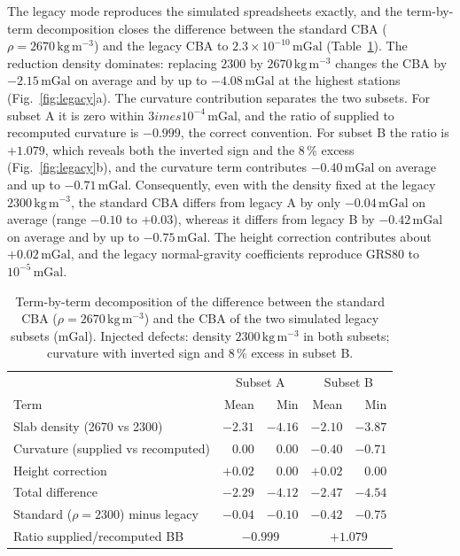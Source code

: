 \documentclass[11pt,a4paper]{article}
\newcommand{\mgal}{\ensuremath{\,\mathrm{mGal}}}
\newcommand{\kgm}{\ensuremath{\,\mathrm{kg\,m^{-3}}}}
\begin{document}
The legacy mode reproduces the simulated spreadsheets exactly, and the term-by-term decomposition closes the difference between the standard CBA ($\rho=2670\kgm$) and the legacy CBA to $2.3\times10^{-10}\mgal$ (Table~\ref{tab:terms}). The reduction density dominates: replacing $2300$ by $2670\kgm$ changes the CBA by $-2.15\mgal$ on average and by up to $-4.08\mgal$ at the highest stations (Fig.~\ref{fig:legacy}a). The curvature contribution separates the two subsets. For subset A it is zero within $3	imes10^{-4}\mgal$, and the ratio of supplied to recomputed curvature is $-0.999$, the correct convention. For subset B the ratio is $+1.079$, which reveals both the inverted sign and the 8\,\% excess (Fig.~\ref{fig:legacy}b), and the curvature term contributes $-0.40\mgal$ on average and up to $-0.71\mgal$. Consequently, even with the density fixed at the legacy $2300\kgm$, the standard CBA differs from legacy A by only $-0.04\mgal$ on average (range $-0.10$ to $+0.03$), whereas it differs from legacy B by $-0.42\mgal$ on average and by up to $-0.75\mgal$. The height correction contributes about $+0.02\mgal$, and the legacy normal-gravity coefficients reproduce GRS80 to $10^{-5}\mgal$.

\begin{table}[t]
\centering\small
\caption{Term-by-term decomposition of the difference between the standard CBA ($\rho=2670\kgm$) and the CBA of the two simulated legacy subsets (mGal). Injected defects: density $2300\kgm$ in both subsets; curvature with inverted sign and 8\,\% excess in subset B.}
\label{tab:terms}
\begin{tabular}{lrrrr}
\toprule
 & \multicolumn{2}{c}{Subset A} & \multicolumn{2}{c}{Subset B} \\
Term & Mean & Min & Mean & Min \\
\midrule
Slab density (2670 vs 2300) & $-2.31$ & $-4.16$ & $-2.10$ & $-3.87$ \\
Curvature (supplied vs recomputed) & $0.00$ & $0.00$ & $-0.40$ & $-0.71$ \\
Height correction & $+0.02$ & $0.00$ & $+0.02$ & $0.00$ \\
Total difference & $-2.29$ & $-4.12$ & $-2.47$ & $-4.54$ \\
\midrule
Standard ($\rho=2300$) minus legacy & $-0.04$ & $-0.10$ & $-0.42$ & $-0.75$ \\
Ratio supplied/recomputed BB & \multicolumn{2}{c}{$-0.999$} & \multicolumn{2}{c}{$+1.079$} \\
\bottomrule
\end{tabular}
\end{table}
\end{document}
